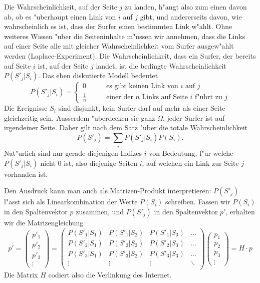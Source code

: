 Die Wahrscheinlichkeit, auf der Seite $j$ zu landen,
h"angt also zum einen davon ab, ob es "uberhaupt
einen Link von $i$ auf $j$ gibt, und andererseits davon, wie wahrscheinlich
es ist, dass der Surfer einen bestimmten Link w"ahlt.
Ohne weiteres Wissen "uber die Seiteninhalte m"ussen wir
annehmen, dass die Links auf einer Seite alle mit gleicher Wahrscheinlichkeit
vom Surfer ausgew"ahlt werden (Laplace-Experiment).
Die Wahrscheinlichkeit, dass ein Surfer, der bereits
auf Seite $i$ ist, auf der Seite $j$ landet, ist die bedingte Wahrscheinlichkeit
$P(S'_j|S_i)$.
Das eben diskutierte Modell bedeutet
\[
P(S'_j|S_i)=\begin{cases}
0&\qquad\text{es gibt keinen Link von $i$ auf $j$}\\
\displaystyle\frac1n&\qquad\text{einer der $n$ Links auf Seite $i$ f"uhrt zu $j$}
\end{cases}
\]
Die Ereignisse $S_i$ sind disjunkt, kein Surfer darf auf mehr als einer
Seite gleichzeitig sein.
Ausserdem "uberdecken sie ganz $\Omega$, jeder Surfer ist auf irgendeiner
Seite.
Daher gilt nach dem Satz "uber die totale Wahrscheinlichkeit
\[
P(S'_j)=\sum_{i}P(S'_j|S_i)P(S_i).
\]
Nat"urlich sind nur gerade diejenigen Indizes $i$ von Bedeutung, f"ur welche $P(S'_j|S_i)$
nicht $0$ ist, also diejenige Seiten $i$, auf welchen ein Link zur Seite $j$
vorhanden ist.

Den Ausdruck kann man auch als Matrizen-Produkt interpretieren: $P(S'_j)$ l"asst sich
als Linearkombination der Werte $P(S_i)$ schreiben.
Fassen wir $P(S_i)$ in den Spaltenvektor
$p$ zusammen, und $P(S'_j)$ in den Spaltenvektor $p'$, erhalten wir die Matrizengleichung
\[
p'=
\left(\begin{matrix}p'_1\\p'_2\\p'_3\\\vdots\end{matrix}\right)
=
\left(\begin{matrix}
P(S'_1|S_1)&P(S'_1|S_2)&P(S'_1|S_3)&\dots\\
P(S'_2|S_1)&P(S'_2|S_2)&P(S'_2|S_3)&\dots\\
P(S'_3|S_1)&P(S'_3|S_2)&P(S'_3|S_3)&\dots\\
\vdots&\vdots&\vdots&\ddots\\
\end{matrix}\right)
\left(\begin{matrix}p_1\\p_2\\p_3\\\vdots\end{matrix}\right)
=
H\cdot p
\]
Die Matrix $H$ codiert also die Verlinkung des Internet.


